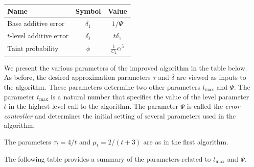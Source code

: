 \documentclass{acmsmall}
\newcommand{\deltapar}{\overline{\delta}}
\newcommand{\deltaval}{1/\errorcont}
\newcommand{\taintprob}{\phi}
\newcommand{\taupar}{\overline{\tau}}
\newcommand{\gridprec}{\alpha}
\newcommand{\errorcont}{\Psi}
\begin{document}
\begin{center}
  \begin{tabular}{ | l || c | c |}
    \hline
    {\bf Name} & {\bf Symbol} & {\bf Value} \\ \hline
    Base additive error & $\delta_1$ & $\deltaval$ \\ \hline
    $t$-level additive error & $\delta_t$ & $t\delta_1$ \\ \hline
    Taint probability & $\taintprob$ & $\frac{1}{C_2}\gridprec^5$    \\ \hline
  \end{tabular}
\end{center}
%
%
%
\iffalse
We present the various parameters of the improved algorithm in the table below.
As before, the desired
approximation parameters $\taupar$ and $\deltapar$ are viewed as inputs to the algorithm. 
These parameters determine
two other parameters $t_{\max}$ and $\errorcont$. The parameter $t_{\max}$ is a natural number that specifies the value of the level parameter $t$ in the highest level call to the algorithm.  
 The parameter $\errorcont$ is called the {\em error controller} and   determines the initial setting of several parameters used in the 
algorithm.

The parameters $\tau_t = 4/t$ and $\mu_t = 2/(t+3)$ are as in the first algorithm. 
 

The following table provides a summary of the parameters related to $t_{\max}$ and $\errorcont$.

\end{document}
